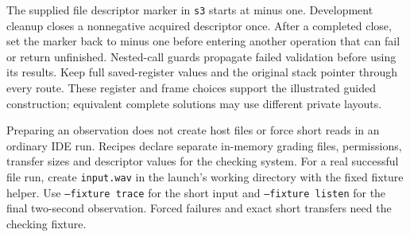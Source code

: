 The supplied file descriptor marker in \texttt{s3} starts at minus one. Development
cleanup closes a nonnegative acquired descriptor once. After a completed close, set
the marker back to minus one before entering another operation that can fail or return
unfinished. Nested-call guards propagate failed validation before using its results.
Keep full saved-register values and the original stack pointer through every route.
These register and frame choices support the illustrated guided construction;
equivalent complete solutions may use different private layouts.

Preparing an observation does not create host files or force short reads in an ordinary
IDE run. Recipes declare separate in-memory grading files, permissions, transfer sizes
and descriptor values for the checking system. For a real successful file run, create
\texttt{input.wav} in the launch's working directory with the fixed fixture helper.
Use \texttt{--fixture trace} for the short input and \texttt{--fixture listen} for the
final two-second observation. Forced failures and exact short transfers need the
checking fixture.
